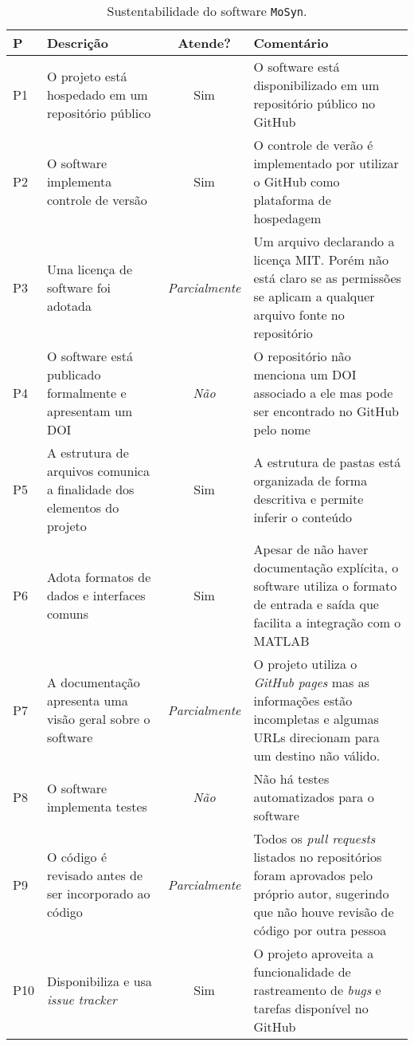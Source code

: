 \begin{table}[htbp]
    \caption{Sustentabilidade do software \texttt{MoSyn}.}
    \centering
    \small
    \begin{tabular}{p{0.5cm}|p{4.8cm}|c|p{6cm}}
    \hline
       \textbf{P} & \textbf{Descrição} & \textbf{Atende?} & \textbf{Comentário}\\
       \hline
        P1 & O projeto está hospedado em um repositório público  & Sim & O software está disponibilizado em um repositório público no GitHub \\
        P2 & O software implementa controle de versão  & Sim & O controle de verão é implementado por utilizar o GitHub como plataforma de hospedagem \\
        P3 & Uma licença de software foi adotada  & \textit{Parcialmente} & Um arquivo declarando a licença MIT. Porém não está claro se as permissões se aplicam a qualquer arquivo fonte no repositório \\
        P4 & O software está publicado formalmente e apresentam um DOI & \textit{Não} & O repositório não menciona um DOI associado a ele mas pode ser encontrado no GitHub pelo nome \\
        P5 & A estrutura de arquivos comunica a finalidade dos elementos do projeto  & Sim & A estrutura de pastas está organizada de forma descritiva e permite inferir o conteúdo \\
        P6 & Adota formatos de dados e interfaces comuns  & Sim & Apesar de não haver documentação explícita, o software utiliza o formato de entrada e saída que facilita a integração com o MATLAB \\
        P7 & A documentação apresenta uma visão geral sobre o software & \textit{Parcialmente} & O projeto utiliza o \textit{GitHub pages} mas as informações estão incompletas e algumas URLs direcionam para um destino não válido. \\
        P8 & O software implementa testes & \textit{Não} & Não há testes automatizados para o software \\
        P9 & O código é revisado antes de ser incorporado ao código  & \textit{Parcialmente} & Todos os \textit{pull requests} listados no repositórios foram aprovados pelo próprio autor, sugerindo que não houve revisão de código por outra pessoa \\
        P10 & Disponibiliza e usa \textit{issue tracker}  & Sim & O projeto aproveita a funcionalidade de rastreamento de \textit{bugs} e tarefas disponível no GitHub \\

\end{tabular}
\end{table}
